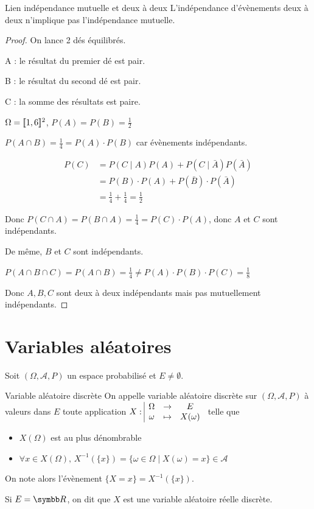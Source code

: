 \begin{proposition}{Lien indépendance mutuelle et deux à deux}{}
    L'indépendance d'évènements deux à deux n'implique pas l'indépendance mutuelle.
\end{proposition}

\begin{proof}
    On lance 2 dés équilibrés.

    A : le résultat du premier dé est pair.

    B : le résultat du second dé est pair.

    C : la somme des résultats est paire.

    $\Omega = [\![1, 6]\!] ^2$, $P(A) = P(B) = \frac 1 2$

    $P(A \cap B) = \frac 1 4 = P(A) \cdot P(B)$ car évènements indépendants.

    \begin{align}
        P(C) & = P(C \mid A) P(A) + P(C \mid \bar A) P(\bar A) \\
        & = P(B) \cdot P(A) + P(\bar B) \cdot P(\bar A) \\
        & = \frac 1 4 + \frac 1 4 = \frac 1 2 
    \end{align} 

    Donc $P(C \cap A) = P(B \cap A) = \frac 1 4 = P(C) \cdot P(A)$, donc 
    $A$ et $C$ sont indépendants.

    De même, $B$ et $C$ sont indépendants.

    $P(A \cap B \cap C) = P(A \cap B) = \frac 1 4 \neq P(A) \cdot P(B) \cdot P(C) = \frac 1 8$

    Donc $A, B, C$ sont deux à deux indépendants mais pas mutuellement indépendants.
\end{proof}

\section{Variables aléatoires }

Soit $(\Omega, \mathcal A, P)$ un espace probabilisé et $E \neq \emptyset$. 

\begin{definition}{Variable aléatoire discrète}{}
    On appelle variable aléatoire discrète sur $(\Omega, \mathcal A, P)$ à valeurs dans $E$
    toute application $X: \space \begin{array}{|ccc} \displaystyle \Omega & \to & \displaystyle E \\ \displaystyle \omega & \mapsto & \displaystyle X(\omega) \end{array}$ telle que 
    \begin{itemize}
        \item $X(\Omega)$ est au plus dénombrable
        \item $\forall x \in X(\Omega), \, X^{-1}(\{x\}) = \{\omega \in \Omega \mid X(\omega) = x\} \in \mathcal A$
    \end{itemize}

    On note alors l'évènement $\{X = x\} = X^{-1}(\{x\})$.
    
    Si $E = \R$, on dit que $X$ est une variable aléatoire réelle discrète.
\end{definition}

